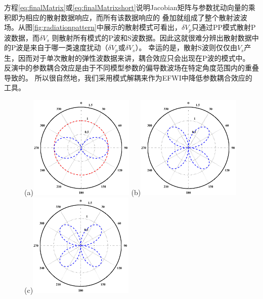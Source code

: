 方程\eqref{eq:finalMatrix}或\eqref{eq:finalMatrixshort}说明Jacobian矩阵与参数扰动向量的乘积即为相应的散射数据响应，而所有该数据响应的
叠加就组成了整个散射波波场。从图\ref{fig:radiationpattern}中展示的散射模式可看出，$\delta V_p$只通过PP模式散射P波数据，而$\delta V_s$
则散射所有模式的P波和S波数据。因此这就很难分辨出散射数据中的P波是来自于哪一类速度扰动（$\delta V_p$或$\delta V_s$）。
幸运的是，散射S波则仅仅由$V_s$产生，因而对于单次散射的弹性波数据来讲，耦合效应只会出现在P波的模式中。
反演中的参数耦合效应是由于不同模型参数的偏导数波场在特定角度范围内的重叠导致的\cite{tarantola:1986,operto2013guided}。
所以很自然地，我们采用模式解耦来作为EFWI中降低参数耦合效应的工具。
\begin{figure}
    \begin{center}
        \subfloat(a){\includegraphics[width=5cm]{Figure/chapter02/radiationpattern/Fig/PP.pdf}}
        \subfloat(b){\includegraphics[width=5cm]{Figure/chapter02/radiationpattern/Fig/PS.pdf}}
        \subfloat(c){\includegraphics[width=5cm]{Figure/chapter02/radiationpattern/Fig/SP.pdf}}

\end{center}
\end{figure}

